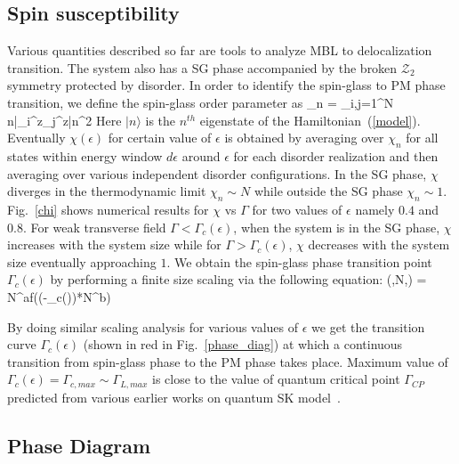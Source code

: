 \documentclass[prl,aps,twocolumn,floats,nofootinbib]{revtex4}
\begin{document}
\subsection{Spin susceptibility}
Various quantities described so far are tools to analyze MBL to delocalization transition. The system also has a SG phase accompanied by the broken $\mathcal{Z}_2$ symmetry protected by disorder. In order to identify the spin-glass to PM phase transition, we define the spin-glass order parameter as
\be
\chi_n = \sum_{i,j=1}^N \langle n|\sigma_i^z\sigma_j^z|n\rangle^2
\label{chi}
\ee
Here $|n\rangle$ is the $n^{th}$ eigenstate of the Hamiltonian~(\ref{model}). Eventually $\chi(\epsilon)$ for certain value of $\epsilon$ is obtained by averaging over $\chi_n$ for all states within energy window $d \epsilon$ around $\epsilon$ for each disorder realization and then averaging over various independent disorder configurations.
In the SG phase, $\chi$ diverges in the thermodynamic limit $\chi_n \sim N$ while outside the SG phase $\chi_n \sim 1 $. 
Fig.~\ref{chi} shows numerical results for $\chi$ vs $\Gamma$ for two values of $\epsilon$ namely $0.4$ and $0.8$. 
For weak transverse field $\Gamma < \Gamma_c(\epsilon)$, when the system is in the SG phase, $\chi$ increases with the system size while for $\Gamma> \Gamma_c(\epsilon)$, $\chi$ decreases with the system size eventually approaching $1$. 
We obtain the spin-glass phase transition point $\Gamma_c(\epsilon)$ by performing a finite size scaling via the following equation:
\be
\chi(\epsilon,N,\Gamma) = N^af((\Gamma-\Gamma_c(\epsilon))*N^b)
\label{scaling}
\ee

By doing similar scaling analysis for various values of $\epsilon$ we get the transition curve $\Gamma_c(\epsilon)$ (shown in red in Fig.~\ref{phase_diag}) at which a continuous transition from spin-glass phase to the PM phase takes place. Maximum value of $\Gamma_c(\epsilon)=\Gamma_{c,max} \sim \Gamma_{L,max}$ is close to the value of quantum critical point $\Gamma_{CP}$ predicted from various earlier works on quantum SK model~\cite{QSK}.

\subsection{Phase Diagram}
\end{document}
